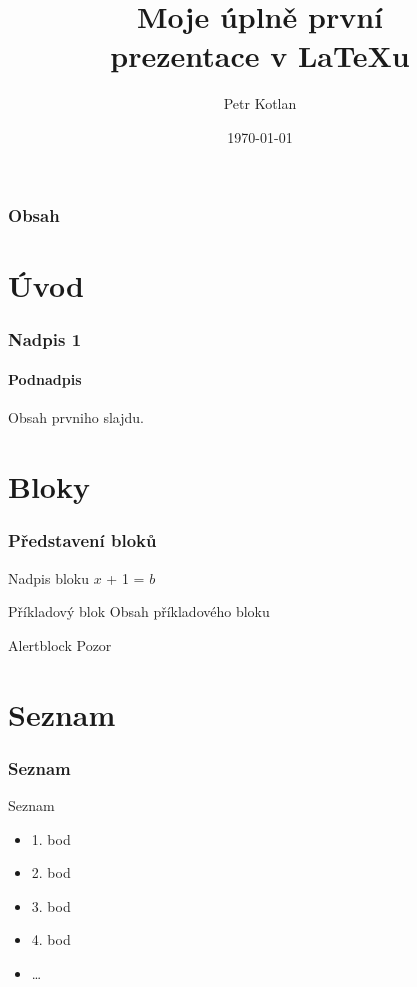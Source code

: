 \documentclass[12pt, aspectratio=169]{beamer} %
\title[První prezentace]{Moje úplně první\\ prezentace v \LaTeX u}
\author[Kotlan]{Petr Kotlan}
\institute[Přf UJEP]{Přírodovědecká fakulta\\ Univerzita J. E. Purkyně}
\date{\today}
\begin{document}
\begin{frame}

    \maketitle
    
\end{frame}

\begin{frame}
    \frametitle{Obsah}
    \tableofcontents
\end{frame}

\section{Úvod}

\begin{frame}
    \frametitle{Nadpis 1}
    \framesubtitle{Podnadpis}
    Obsah prvniho slajdu.
\end{frame}

\section{Bloky}

\begin{frame}
    \frametitle{Představení bloků}
    \begin{block}{Nadpis bloku}
        \centering
        $x$ + 1 = $b$
    \end{block}

    \pause

    \begin{exampleblock}{Příkladový blok}
        Obsah příkladového bloku
    \end{exampleblock}

    \pause

    \begin{alertblock}{Alertblock}
        Pozor

    \end{alertblock}
\end{frame}

\section{Seznam}

\begin{frame}
    \frametitle{Seznam}
    \begin{block}{Seznam}        
    \begin{itemize}[<+->] %
        \item 1. bod
        \item 2. bod
        \item 3. bod
        \item 4. bod
        \item \dots
    \end{itemize}
    \end{block}
\end{frame}
\end{document}
